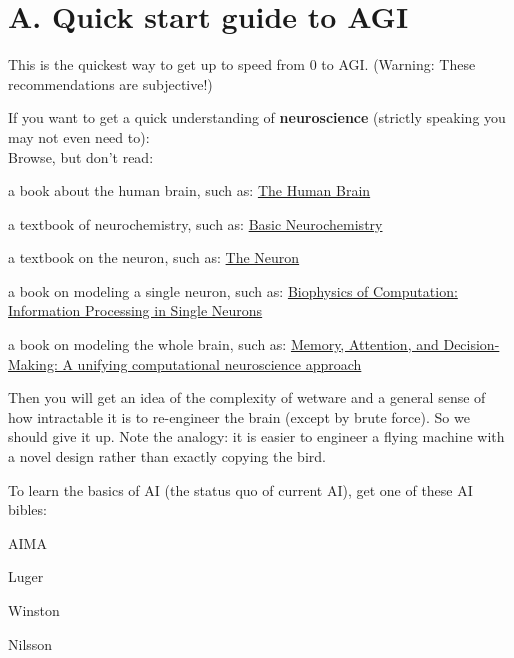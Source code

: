 \chapter*{A. Quick start guide to AGI}

This is the quickest way to get up to speed from 0 to AGI.  (Warning: These recommendations are subjective!)

If you want to get a quick understanding of \textbf{neuroscience} (strictly speaking you may not even need to):\\
Browse, but don't read:
\begin{compactenum-}[\textbullet ]
\item a book about the human brain, such as: \href{http://www.amazon.com/Human-Brain-Introduction-Functional-Anatomy/dp/0323041310/ref=sr_1_2?ie=UTF8&s=books&qid=1268965281&sr=8-2}
{The Human Brain}
\item a textbook of neurochemistry, such as:
\href{http://www.amazon.com/Basic-Neurochemistry-Seventh-Molecular-Cellular/dp/012088397X/ref=sr_1_1?ie=UTF8&s=books&qid=1268965399&sr=1-1}
{Basic Neurochemistry}
\item a textbook on the neuron, such as:
\href{http://www.amazon.com/Neuron-Cell-Molecular-Biology/dp/0195145232/ref=sr_1_1?ie=UTF8&s=books&qid=1268965470&sr=1-1}
{The Neuron}
\item a book on modeling a single neuron, such as:
\href{http://www.amazon.com/Biophysics-Computation-Information-Computational-Neuroscience/dp/0195181999/ref=sr_1_1?ie=UTF8&s=books&qid=1268967514&sr=1-1}
{Biophysics of Computation: Information Processing in Single Neurons}
\item a book on modeling the whole brain, such as:
\href{http://www.amazon.com/Memory-Attention-Decision-Making-computational-neuroscience/dp/0199232709/ref=ntt_at_ep_dpt_2}
{Memory, Attention, and Decision-Making: A unifying computational neuroscience approach}
\end{compactenum-}
Then you will get an idea of the complexity of wetware and a general sense of how intractable it is to re-engineer the brain (except by brute force).  So we should give it up.  Note the analogy:  it is easier to engineer a flying machine with a novel design rather than exactly copying the bird.

\underconst

To learn the basics of AI (the status quo of current AI), get one of these AI bibles:
\begin{compactenum-}[\textbullet ]
\item AIMA
\item Luger
\item Winston
\item Nilsson
\end{compactenum-}

